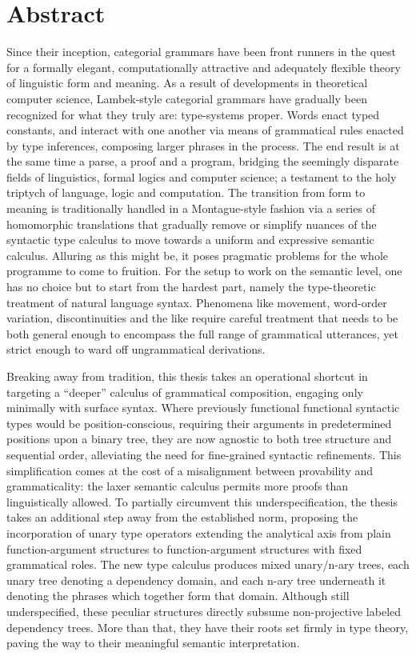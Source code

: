 \chapter*{Abstract}
Since their inception, categorial grammars have been front runners in the quest for a formally elegant, computationally attractive and adequately flexible theory of linguistic form and meaning.
As a result of developments in theoretical computer science, Lambek-style categorial grammars have gradually been recognized for what they truly are: type-systems proper.
Words enact typed constants, and interact with one another via means of grammatical rules enacted by type inferences, composing larger phrases in the process.
The end result is at the same time a parse, a proof and a program, bridging the seemingly disparate fields of linguistics, formal logics and computer science; a testament to the holy triptych of language, logic and computation.
The transition from form to meaning is traditionally handled in a Montague-style fashion via a series of homomorphic translations that gradually remove or simplify nuances of the syntactic type calculus to move towards a uniform and expressive semantic calculus.
Alluring as this might be, it poses pragmatic problems for the whole programme to come to fruition.
For the setup to work on the semantic level, one has no choice but to start from the hardest part, namely the type-theoretic treatment of natural language syntax.
Phenomena like movement, word-order variation, discontinuities and the like require careful treatment that needs to be both general enough to encompass the full range of grammatical utterances, yet strict enough to ward off ungrammatical derivations.

Breaking away from tradition, this thesis takes an operational shortcut in targeting a ``deeper'' calculus of grammatical composition, engaging only minimally with surface syntax.
Where previously functional functional syntactic types would be position-conscious, requiring their arguments in predetermined positions upon a binary tree, they are now agnostic to both tree structure and sequential order, alleviating the need for fine-grained syntactic refinements.
This simplification comes at the cost of a misalignment between provability and grammaticality: the laxer semantic calculus permits more proofs than linguistically allowed.
To partially circumvent this underspecification, the thesis takes an additional step away from the established norm, proposing the incorporation of unary type operators extending the analytical axis from plain function-argument structures to function-argument structures with fixed grammatical roles.
The new type calculus produces mixed unary/n-ary trees, each unary tree denoting a dependency domain, and each n-ary tree underneath it denoting the phrases which together form that domain.
Although still underspecified, these peculiar structures directly subsume non-projective labeled dependency trees.
More than that, they have their roots set firmly in type theory, paving the way to their meaningful semantic interpretation.


